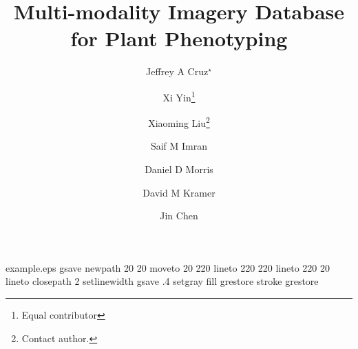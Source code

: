 %
%
%
%
%
\begin{filecontents*}{example.eps}
gsave
newpath
  20 20 moveto
  20 220 lineto
  220 220 lineto
  220 20 lineto
closepath
2 setlinewidth
gsave
  .4 setgray fill
grestore
stroke
grestore
\end{filecontents*}
%
\RequirePackage{fix-cm}
%
\documentclass[smallextended]{svjour3}       %
%
\smartqed  %
%
\usepackage{bm}
\usepackage{graphicx}
\usepackage{epstopdf}
\usepackage{color}
\usepackage{multirow}
\usepackage{tabularx}
%
%
%
%
%



\title{Multi-modality Imagery Database for Plant Phenotyping %
}


\author{Jeffrey A Cruz$^\star$ \and Xi Yin\footnote{Equal contributor}  \and Xiaoming Liu\footnote{Contact author. } \and Saif M Imran \and Daniel D Morris \and David M Kramer    \and Jin Chen}

